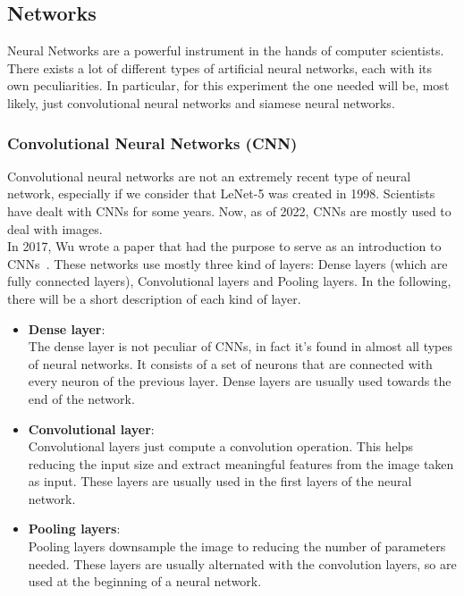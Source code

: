 \documentclass[conference]{IEEEtran}
\begin{document}
			\subsection{Networks}
			
				\noindent Neural Networks are a powerful instrument in the hands of computer scientists. There exists a lot of different types of artificial neural networks, each with its own peculiarities. In particular, for this 
				experiment the one needed will be, most likely, just convolutional neural networks and siamese neural networks. 
			
				\subsubsection{Convolutional Neural Networks (CNN)}
				
					Convolutional neural networks are not an extremely recent type of neural network, especially if we consider that LeNet-5 was created in 1998. Scientists have dealt with CNNs for some years. Now, as of 2022, 
					CNNs are mostly used to deal with images.\\
					In 2017, Wu wrote a paper that had the purpose to serve as an introduction to CNNs~\cite{wu2017introduction}. These networks use mostly three kind of layers: Dense layers (which are fully connected layers), 
					Convolutional layers and Pooling layers. In the following, there will be a short description of each kind of layer. 
					\begin{itemize}
						
						\item \textbf{Dense layer}:\\
							The dense layer is not peculiar of CNNs, in fact it's found in almost all types of neural networks. It consists of a set of neurons that are connected with every neuron of the previous 
							layer. Dense layers are usually used towards the end of the network.
						
						\item \textbf{Convolutional layer}:\\
							Convolutional layers just compute a convolution operation. This helps reducing the input size and extract meaningful features from the image taken as input. These layers are usually used 
							in the first layers of the neural network.
						
						\item \textbf{Pooling layers}:\\
							Pooling layers downsample the image to reducing the number of parameters needed. These layers are usually alternated with the convolution layers, so are used at the beginning of a neural network.
							
					\end{itemize}
					
\end{document}
